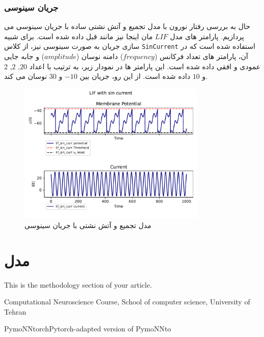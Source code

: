 \documentclass{article}
\begin{document}
            \subsubsection{جریان سینوسی}
                حال به بررسی رفتار نورون با مدل تجمیع و آتش نشتی ساده با جریان سینوسی می پردازیم. پارامتر های مدل 
                $LIF$
                مان اینجا نیز مانند قبل داده شده است.
                برای شبیه سازی جریان به صورت سینوسی نیز، از کلاس 
                \texttt{SinCurrent} 
                استفاده شده است که در آن، پارامتر های تعداد فرکانس
                ($frequency$) 
                دامنه نوسان
                ($amplitude$)
                و جابه جایی عمودی و افقی داده شده است. این پارامتر ها در نمودار زیر، به ترتیب با اعداد 
                $20$, 
                $2$, 
                $2$ و
                $10$ 
                داده شده است.
                از این رو، جریان بین 
                $-10$ و
                $30$ 
                نوسان می کند. 
                \begin{figure}[h]
                    \centering
                    \includegraphics[width=0.8\textwidth]{plots/LIF with sin current.pdf} 
                    \caption{مدل تجمیع و آتش نشتی با جریان سینوسی}
                    \label{fig:lif-sin-curr}
                \end{figure}



\newpage
\section{مدل}

This is the methodology section of your article.



\newpage
\begin{thebibliography}{1}
        \begin{latin}
            Computational Neuroscience Course, School of computer science, University of Tehran
        \end{latin}
        \begin{latin}
            PymoNNtorchPytorch-adapted version of PymoNNto
        \end{latin}
    
    \end{thebibliography}
\end{document}
